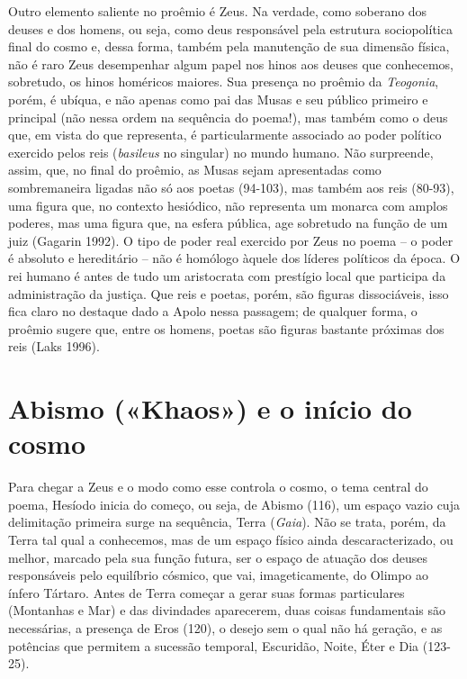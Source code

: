 Outro elemento saliente no proêmio é Zeus. Na verdade, como soberano dos
deuses e dos homens, ou seja, como deus responsável pela estrutura
sociopolítica final do cosmo e, dessa forma, também pela manutenção de
sua dimensão física, não é raro Zeus desempenhar algum papel nos hinos
aos deuses que conhecemos, sobretudo, os hinos homéricos maiores. Sua
presença no proêmio da \emph{Teogonia}, porém, é ubíqua, e não apenas
como pai das Musas e seu público primeiro e principal (não nessa ordem
na sequência do poema!), mas também como o deus que, em vista do que
representa, é particularmente associado ao poder político exercido pelos
reis (\emph{basileus} no singular) no mundo humano. Não surpreende,
assim, que, no final do proêmio, as Musas sejam apresentadas como
sombremaneira ligadas não só aos poetas (94-103), mas também aos reis
(80-93), uma figura que, no contexto hesiódico, não representa um
monarca com amplos poderes, mas uma figura que, na esfera pública, age
sobretudo na função de um juiz (Gagarin 1992). O tipo de poder real
exercido por Zeus no poema -- o poder é absoluto e hereditário -- não é
homólogo àquele dos líderes políticos da época. O rei humano é antes de
tudo um aristocrata com prestígio local que participa da administração
da justiça. Que reis e poetas, porém, são figuras dissociáveis, isso
fica claro no destaque dado a Apolo nessa passagem; de qualquer forma, o
proêmio sugere que, entre os homens, poetas são figuras bastante
próximas dos reis (Laks 1996).

\section{Abismo («Khaos») e o início do cosmo}

Para chegar a Zeus e o modo como esse controla o cosmo, o tema central
do poema, Hesíodo inicia do começo, ou seja, de Abismo (116), um espaço
vazio cuja delimitação primeira surge na sequência, Terra (\emph{Gaia}).
Não se trata, porém, da Terra tal qual a conhecemos, mas de um espaço
físico ainda descaracterizado, ou melhor, marcado pela sua função
futura, ser o espaço de atuação dos deuses responsáveis pelo equilíbrio
cósmico, que vai, imageticamente, do Olimpo ao ínfero Tártaro. Antes de
Terra começar a gerar suas formas particulares (Montanhas e Mar) e das
divindades aparecerem, duas coisas fundamentais são necessárias, a
presença de Eros (120), o desejo sem o qual não há geração, e as
potências que permitem a sucessão temporal, Escuridão, Noite, Éter e Dia
(123-25).

